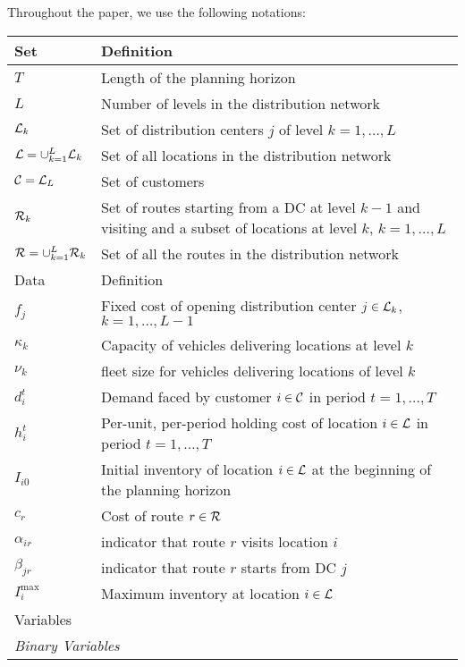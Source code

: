\documentclass[10pt, a4paper]{article}
\begin{document}
Throughout the paper, we use the following notations:
\begin{table}
    \centering
    \begin{tabular}{ll}
        \hline
        Set & Definition \\
        \hline
        $T$ & Length of the planning horizon\\
        $L$ & Number of levels in the distribution network\\
        $\mathcal{L}_k$ & Set of distribution centers $j$ of level $k=1, \ldots,L$ \\
        $\mathcal{L}=\cup_{k=1}^L \mathcal{L}_k$ & Set of all locations in the distribution network\\
        $\mathcal{C}=\mathcal{L}_L$ & Set of customers \\ 
        $\mathcal{R}_k$ & Set of routes starting from a DC at level $k-1$ and visiting and a subset of locations at level $k$, $k=1,\ldots,L$\\
        $\mathcal{R} = \cup_{k=1}^{L} \mathcal{R}_k$ & Set of all the routes in the distribution network\\
        \hline
        \hline
        Data & Definition \\
        \hline
        $f_j$ & Fixed cost of opening distribution center $j\in\mathcal{L}_k$, $k=1,\ldots,L-1$\\ 
        $\kappa_k$ & Capacity of vehicles delivering locations at level $k$\\ 
        $\nu_k$ & fleet size for vehicles delivering locations of level $k$\\ 
        $d^t_i$ & Demand faced by customer $i\in\mathcal{C}$ in period $t=1,\ldots,T$\\
        $h^t_i$ & Per-unit, per-period holding cost of location $i\in\mathcal{L}$ in period $t=1,\ldots, T$\\
        $I_{i0}$ & Initial inventory of location $i\in \mathcal{L}$ at the beginning of the planning horizon\\
        $c_r$ & Cost of route $r\in \mathcal{R}$\\
        $\alpha_{ir}$ & indicator that route $r$ visits location $i$\\
        $\beta_{jr}$ & indicator that route $r$ starts from DC $j$\\
        $I_i^{\max}$ & Maximum inventory at location $i\in\mathcal{L}$\\
        \hline
        \hline
        \multicolumn{2}{l}{Variables}\\
        \hline
        \multicolumn{2}{l}{\textit{Binary Variables}}\\

\end{tabular}
\end{table}
\end{document}
